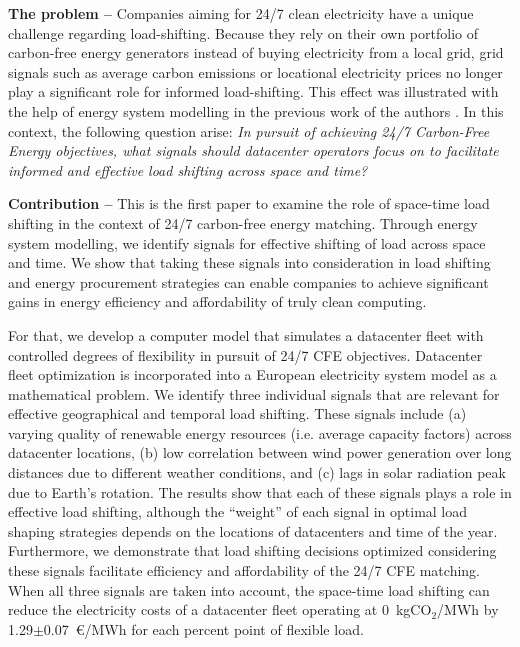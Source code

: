 \textbf{The problem --}
Companies aiming for 24/7 clean electricity have a unique challenge regarding load-shifting. Because they rely on their own portfolio of carbon-free energy generators instead of buying electricity from a local grid, grid signals such as average carbon emissions or locational electricity prices no longer play a significant role for informed load-shifting. This effect was illustrated with the help of energy system modelling in the previous work of the authors \cite{riepin-zenodo-systemlevel247,riepinMeansCostsSystemlevel2023}. In this context, the following question arise: \textit{In pursuit of achieving 24/7 Carbon-Free Energy objectives, what signals should datacenter operators focus on to facilitate informed and effective load shifting across space and time?}

\textbf{Contribution --} This is the first paper to examine the role of space-time load shifting in the context of 24/7 carbon-free energy matching.
Through energy system modelling, we identify signals for effective shifting of load across space and time. We show that taking these signals into consideration in load shifting and energy procurement strategies can enable companies to achieve significant gains in energy efficiency and affordability of truly clean computing.

For that, we develop a computer model that simulates a datacenter fleet with controlled degrees of flexibility in pursuit of 24/7 CFE objectives. Datacenter fleet optimization is incorporated into a European electricity system model as a mathematical problem.
We identify three individual signals that are relevant for effective geographical and temporal load shifting. These signals include (a) varying quality of renewable energy resources (i.e. average capacity factors) across datacenter locations, (b) low correlation between wind power generation over long distances due to different weather conditions, and (c) lags in solar radiation peak due to Earth's rotation. The results show that each of these signals plays a role in effective load shifting, although the \enquote{weight} of each signal in optimal load shaping strategies depends on the locations of datacenters and time of the year.
Furthermore, we demonstrate that load shifting decisions optimized considering these signals facilitate efficiency and affordability of the 24/7 CFE matching. When all three signals are taken into account, the space-time load shifting can reduce the electricity costs of a datacenter fleet operating at 0~kgCO$_2$/MWh by 1.29$\pm$0.07~\euro/MWh for each percent point of flexible load.

